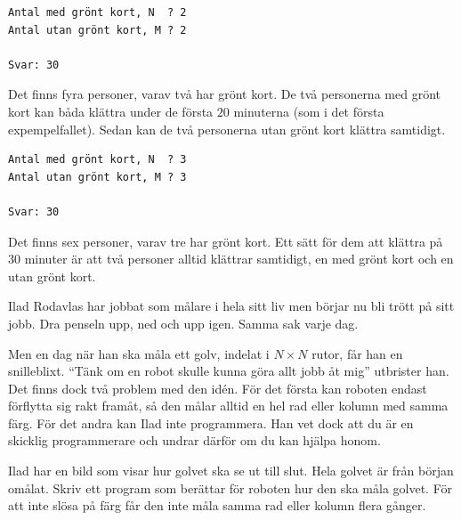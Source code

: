 \vspace{0.5cm}

\begin{verbatim}
Antal med grönt kort, N  ? 2
Antal utan grönt kort, M ? 2

Svar: 30
\end{verbatim}

 Det finns fyra personer, varav två har grönt kort.
De två personerna med grönt kort kan båda klättra under de första $20$ minuterna (som i det första expempelfallet).
Sedan kan de två personerna utan grönt kort klättra samtidigt.

\vspace{0.5cm}

\begin{verbatim}
Antal med grönt kort, N  ? 3
Antal utan grönt kort, M ? 3

Svar: 30
\end{verbatim}

 Det finns sex personer, varav tre har grönt kort.
Ett sätt för dem att klättra på $30$ minuter är att två personer alltid klättrar samtidigt, en med grönt kort och en utan grönt kort.


\newpage
{}

Ilad Rodavlas har jobbat som målare i hela sitt liv men börjar nu bli trött på sitt jobb.
Dra penseln upp, ned och upp igen.
Samma sak varje dag.

Men en dag när han ska måla ett golv, indelat i $N \times N$ rutor, får han en snilleblixt.
``Tänk om en robot skulle kunna göra allt jobb åt mig'' utbrister han.
Det finns dock två problem med den  idén.
För det första kan roboten endast förflytta sig rakt framåt, så den målar alltid en hel rad eller kolumn med samma färg.
För det andra kan Ilad inte programmera.
Han vet dock att du är en skicklig programmerare och undrar därför om du kan hjälpa honom. 

Ilad har en bild som visar hur golvet ska se ut till slut. Hela golvet är från början omålat.
Skriv ett program som berättar för roboten hur den ska måla golvet.
För att inte slösa på färg får den inte måla samma rad eller kolumn flera gånger.


